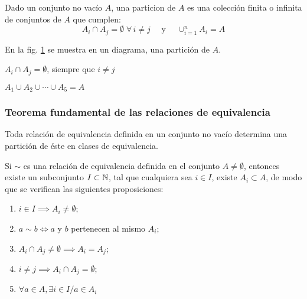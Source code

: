 \begin{fmd-definition}[Partición] 
	Dado un conjunto no vacío $A$, una \gls{particion} de $A$ es una colección finita o infinita de conjuntos de $A$ que cumplen:
	\[ A_i \cap A_j = \emptyset \; \forall \, i \ne j \quad \text{ y } \quad \cup_{i=1}^n A_i = A \]
\end{fmd-definition}

En la fig. \ref{fig:particion} se muestra en un diagrama, una partición de $A$.

\begin{minipage}{.45\textwidth}
	\begin{figure}[H]
		\centering
		
		\caption{}
		\label{fig:particion}
	\end{figure}
\end{minipage}
\begin{minipage}{.45\textwidth}
	$A_i \cap A_j = \emptyset$, siempre que $i \ne j$
	
	$A_1 \cup A_2 \cup \cdots \cup A_5 = A$
\end{minipage}

\subsubsection{Teorema fundamental de las relaciones de equivalencia}
Toda relación de equivalencia definida en un conjunto no vacío determina una partición de éste en clases de equivalencia.

\begin{fmd-theorem}
	Si $\sim$ es una relación de equivalencia definida en el conjunto $A \ne \emptyset$, entonces existe un subconjunto $I \subset \mathbb{N}$, tal que cualquiera sea $i \in I$, existe $A_i \subset A$, de modo que se verifican las siguientes proposiciones:
	\begin{enumerate}[label=\roman*)]
		\item $i \in I \implies A_i \ne \emptyset$;
		\item $a \sim b \iff a$ y $b$ pertenecen al mismo $A_i$;
		\item $A_i \cap A_j \ne \emptyset \implies A_i = A_j$;
		\item $i \ne j \implies A_i \cap A_j = \emptyset$;
		\item $\forall a \in A, \exists i \in I / a \in A_i$
	\end{enumerate}
\end{fmd-theorem}

